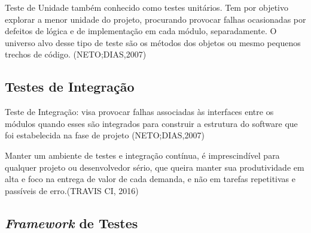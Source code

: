          Teste de Unidade também conhecido como testes unitários. Tem por objetivo explorar a menor unidade do projeto, procurando provocar falhas ocasionadas por defeitos de lógica e de implementação em cada módulo, separadamente. O universo alvo desse tipo de teste são os métodos dos objetos ou mesmo pequenos trechos de código. (NETO;DIAS,2007)
        
        

    \subsection{Testes de Integração}

        Teste de Integração: visa provocar falhas associadas às interfaces entre os módulos quando esses são integrados para construir a estrutura do software que foi estabelecida na fase de projeto 
        (NETO;DIAS,2007)

        Manter um ambiente de testes e integração contínua, é imprescindível para qualquer projeto ou desenvolvedor sério, que queira manter sua produtividade em alta e foco na entrega de valor de cada demanda, e não em tarefas repetitivas e passíveis de erro.(TRAVIS CI, 2016)


    \subsection{\textit{Framework} de Testes}
        
